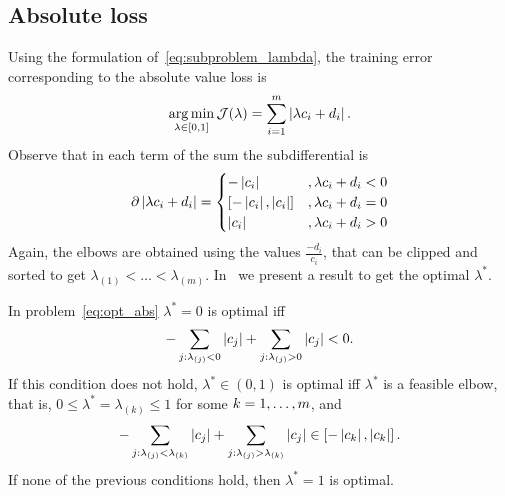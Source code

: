 \subsection{Absolute loss}
Using the formulation of~\eqref{eq:subproblem_lambda}, the training error corresponding to the absolute value loss is
\begin{equation}
    \label{eq:opt_abs}
    \argmin_{\lambda \in [0, 1]} \mathcal{J}(\lambda) = \sum_{i=1}^{\npertask} \abs{\lambda c_i + d_i}.
\end{equation}
Observe that in each term of the sum the subdifferential is 
\begin{align*}
    \partial \abs{\lambda c_i + d_i} = 
    \begin{cases}
        -\abs{c_i} &, \lambda c_i + d_i  < 0 \\
        [-\abs{c_i}, \abs{c_i}] &, \lambda c_i + d_i  = 0 \\
        \abs{c_i} &, \lambda c_i + d_i  > 0 \\
    \end{cases} 
\end{align*}
Again, the elbows are obtained using the values $\frac{-d_i}{c_i}$, that can be clipped and sorted to get ${\lambda}_{(1)} < \ldots < {\lambda}_{(m)}$.
In~\citet[Proposition 2]{RuizAD21} we present a result to get the optimal $\lambda^*$.
\begin{prop}\label{prop:abs_neurocom2020}
    In problem~\eqref{eq:opt_abs} $\lambda^*=0$ is optimal iff
    \begin{equation}\nonumber
        - \sum_{j: \lambda_{(j)} < 0} \left|c_{j}\right| + \sum_{j: \lambda_{(j)} > 0} \left|c_{j}\right| < 0.
        \end{equation}
    If this condition does not hold, $\lambda^* \in (0,1)$ is optimal iff $\lambda^*$ is a feasible elbow, that is, $0 \leq \lambda^* = \lambda_{(k)} \leq 1$ for some $k=1, \dotsc, m$, and
    \begin{equation}\label{sol_abs_e}
    - \sum_{j: \lambda_{(j)} < \lambda_{(k)}} \abs{c_{j}} + \sum_{j: \lambda_{(j)} > \lambda_{(k)}} \abs{c_{j}} \in \left[ -  \abs{c_{k}},  \abs{c_{k}}  \right] .
    \end{equation}
    If none of the previous conditions hold, then $\lambda^*=1$ is optimal.
\end{prop}


